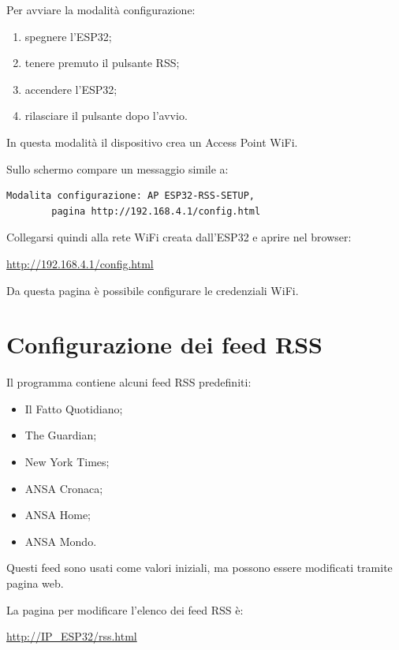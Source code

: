 \documentclass[11pt,a4paper]{article}
\begin{document}
	Per avviare la modalità configurazione:
	
	\begin{enumerate}
		\item spegnere l'ESP32;
		\item tenere premuto il pulsante RSS;
		\item accendere l'ESP32;
		\item rilasciare il pulsante dopo l'avvio.
	\end{enumerate}
	
	In questa modalità il dispositivo crea un Access Point WiFi.
	
	Sullo schermo compare un messaggio simile a:
	
	\begin{lstlisting}[style=codice]
		Modalita configurazione: AP ESP32-RSS-SETUP,
		pagina http://192.168.4.1/config.html
	\end{lstlisting}
	
	Collegarsi quindi alla rete WiFi creata dall'ESP32 e aprire nel browser:
	
	\begin{center}
		\url{http://192.168.4.1/config.html}
	\end{center}
	
	Da questa pagina è possibile configurare le credenziali WiFi.
	
	\section{Configurazione dei feed RSS}
	
	Il programma contiene alcuni feed RSS predefiniti:
	
	\begin{itemize}
		\item Il Fatto Quotidiano;
		\item The Guardian;
		\item New York Times;
		\item ANSA Cronaca;
		\item ANSA Home;
		\item ANSA Mondo.
	\end{itemize}
	
	Questi feed sono usati come valori iniziali, ma possono essere modificati tramite pagina web.
	
	La pagina per modificare l'elenco dei feed RSS è:
	
	\begin{center}
		\url{http://IP_ESP32/rss.html}
	\end{center}
	
\end{document}
